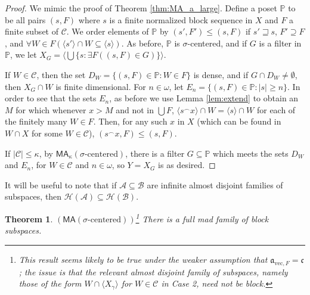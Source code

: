 \documentclass[11pt]{amsart}
\renewcommand{\P}{\mathbb{P}}
\newcommand{\LC}{\mathcal{C}}
\newcommand{\LA}{\mathcal{A}}
\newcommand{\LB}{\mathcal{B}}
\renewcommand{\a}{\mathfrak{a}}
\renewcommand{\c}{\mathfrak{c}}
\newtheorem{thm}{Theorem}[section]
\theoremstyle{definition}
\theoremstyle{remark}
\newcommand{\LH}{\mathcal{H}}
\newcommand{\concat}{^\smallfrown}
\newcommand{\MA}{\mathsf{MA}}
\renewcommand{\P}{\mathbb{P}}
\renewcommand{\1}{\mathbf{1}}
\begin{document}
\begin{proof}
	We mimic the proof of Theorem \ref{thm:MA_a_large}. Define a poset $\P$ to be all pairs $(s,F)$ where $s$ is a finite normalized block sequence in $X$ and $F$ a finite subset of $\LC$. We order elements of $\P$ by $(s',F')\leq(s,F)$ if $s'\sqsupseteq s$, $F'\supseteq F$, and $\forall W\in F(\langle s'\rangle\cap W\subseteq\langle s\rangle)$. As before, $\P$ is $\sigma$-centered, and if $G$ is a filter in $\P$, we let $X_G=\langle\bigcup\{s:\exists F((s,F)\in G)\}\rangle$.
	
	If $W\in\LC$, then the set $D_W=\{(s,F)\in\P:W\in F\}$ is dense, and if $G\cap D_W\neq\emptyset$, then $X_G\cap W$ is finite dimensional. For $n\in\omega$, let $E_n=\{(s,F)\in\P:|s|\geq n\}$. In order to see that the sets $E_n$, as before we use Lemma \ref{lem:extend} to obtain an $M$ for which whenever $x>M$ and not in $\bigcup F$, $\langle s\concat x\rangle\cap W=\langle s\rangle\cap W$ for each of the finitely many $W\in F$. Then, for any such $x$ in $X$ (which can be found in $W\cap X$ for some $W\in\LC$), $(s\concat x,F)\leq(s,F)$.

	If $|\LC|\leq\kappa$, by $\MA_\kappa(\sigma\text{-centered})$, there is a filter $G\subseteq\P$ which meets the sets $D_W$ and $E_n$, for $W\in\LC$ and $n\in\omega$, so $Y=X_G$ is as desired.
\end{proof}

It will be useful to note that if $\LA\subseteq\LB$ are infinite almost disjoint families of subspaces, then $\LH(\LA)\subseteq\LH(\LB)$.

\begin{thm}\label{thm:full_mad}
	$(\MA(\sigma\text{-centered}))$\footnote{This result seems likely to be true under the weaker assumption that $\a_{\mathrm{vec},F}=\c$; the issue is that the relevant almost disjoint family of subspaces, namely those of the form $W\cap \langle X_\gamma\rangle$ for $W\in\LC$ in Case 2, need not be \emph{block}.} There is a full mad family of block subspaces.
\end{thm}
\end{document}
